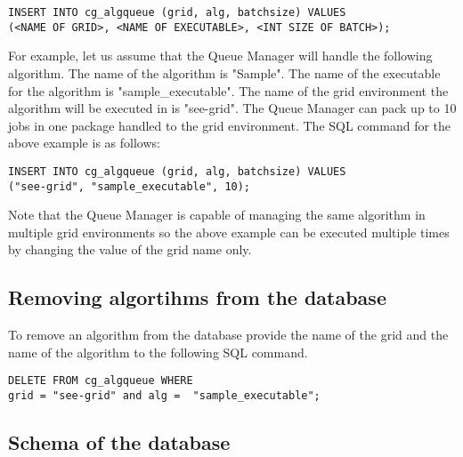 \documentclass[a4paper, 12pt]{article}
\begin{document}
\begin{verbatim}
INSERT INTO cg_algqueue (grid, alg, batchsize) VALUES 
(<NAME OF GRID>, <NAME OF EXECUTABLE>, <INT SIZE OF BATCH>);
\end{verbatim}

For example, let us assume that the Queue Manager will handle the following algorithm. The name of the algorithm is "Sample". The name of the executable for the algorithm is "sample\_executable". The name of the grid environment the algorithm will be executed in is "see-grid". The Queue Manager can pack up to 10 jobs in one package handled to the grid environment. The SQL command for the above example is as follows:

\begin{verbatim}
INSERT INTO cg_algqueue (grid, alg, batchsize) VALUES 
("see-grid", "sample_executable", 10);
\end{verbatim}

Note that the Queue Manager is capable of managing the same algorithm in multiple grid environments so the above example can be executed multiple times by changing the value of the grid name only.

\subsection{Removing algortihms from the database}

To remove an algorithm from the database provide the name of the grid and the name of the algorithm to   the following SQL command.

\begin{verbatim}
DELETE FROM cg_algqueue WHERE
grid = "see-grid" and alg =  "sample_executable";
\end{verbatim}


\subsection{Schema of the database}
\label{sec:schema}
\end{document}
